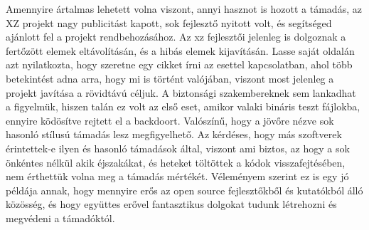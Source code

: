\documentclass[11pt]{article}
\begin{document}
Amennyire ártalmas lehetett volna viszont, annyi hasznot is hozott a támadás, az XZ projekt nagy publicitást kapott, sok fejlesztő nyitott volt, és segítséged ajánlott fel a projekt rendbehozásához. Az xz fejlesztői jelenleg is dolgoznak a fertőzött elemek eltávolításán, és a hibás elemek kijavításán. Lasse saját oldalán azt nyilatkozta, hogy szeretne egy cikket írni az esettel kapcsolatban, ahol több betekintést adna arra, hogy mi is történt valójában, viszont most jelenleg a projekt javítása a rövidtávú céljuk. \cite{Collin_2024}
A biztonsági szakembereknek sem lankadhat a figyelmük, hiszen talán ez volt az első eset, amikor valaki bináris teszt fájlokba, ennyire ködösítve rejtett el a backdoort. Valószínű, hogy a jövőre nézve sok hasonló stílusú támadás lesz megfigyelhető.
Az kérdéses, hogy más szoftverek érintettek-e ilyen és hasonló támadások által, viszont ami biztos, az hogy a sok önkéntes nélkül akik éjszakákat, és heteket töltöttek a kódok visszafejtésében, nem érthettük volna meg a támadás mértékét. Véleményem szerint ez is egy jó példája annak, hogy mennyire erős az open source fejlesztőkből és  kutatókból álló közösség, és hogy együttes erővel fantasztikus dolgokat tudunk létrehozni és megvédeni a támadóktól.


\clearpage



\clearpage
\tableofcontents
\end{document}
